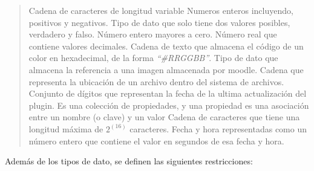     \begin{quote}
    \begin{bGlosario}
         Cadena de caracteres de longitud variable
                 Numeros enteros incluyendo, positivos y negativos.
         Tipo de dato que solo tiene dos valores posibles,
                                  verdadero y falso.
         Número entero mayores a cero.
           Número real que contiene valores decimales.
             Cadena de texto que almacena el código de un color en hexadecimal,
                                  de la forma {\it ``\#RRGGBB''}.
            Tipo de dato que almacena la referencia a una imagen almacenada por
                                  moodle.
               Cadena que representa la ubicación de un archivo dentro del sistema
                                  de archivos.
         Conjunto de dígitos que representan la fecha de la ultima
                                  actualización del plugin.
          Es una colección de propiedades, y una propiedad es una
                                  asociación entre un nombre (o clave) y un valor
              Cadena de caracteres que tiene una longitud máxima de $2^{(16)}$ caracteres.
             Fecha y hora representadas como un número entero que contiene el valor en segundos de esa fecha y hora.
    \end{bGlosario}
    \end{quote}

 Además de los tipos de dato, se definen las
 siguientes restricciones:

